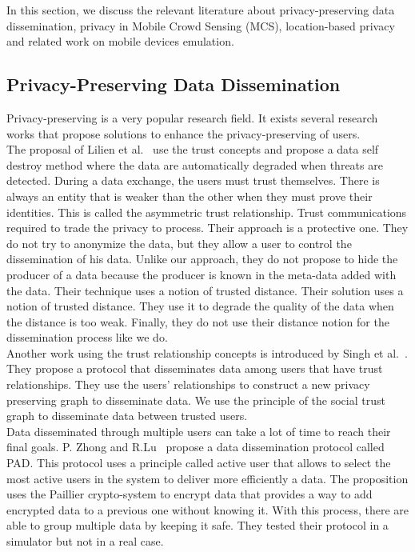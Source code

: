 

In this section, we discuss the relevant literature about privacy-preserving data dissemination, privacy in Mobile Crowd Sensing (MCS), location-based privacy and related work on mobile devices emulation.

\subsection{Privacy-Preserving Data Dissemination}

Privacy-preserving is a very popular research field.
It exists several research works that propose solutions to enhance the privacy-preserving of users.
\\

The proposal of Lilien et al.~\cite{DBLP:journals/tsmc/LilienB06} use the trust concepts and propose a data self destroy method where the data are automatically degraded when threats are detected.
During a data exchange, the users must trust themselves.
There is always an entity that is weaker than the other when they must prove their identities.
This is called the asymmetric trust relationship.
Trust communications required to trade the privacy to process.
Their approach is a protective one.
They do not try to anonymize the data, but they allow a user to control the dissemination of his data.
Unlike our approach, they do not propose to hide the producer of a data because the producer is known in the meta-data added with the data.
Their technique uses a notion of trusted distance.
Their solution uses a notion of trusted distance.
They use it to degrade the quality of the data when the distance is too weak.
Finally, they do not use their distance notion for the dissemination process like we do.
\\

Another work using the trust relationship concepts is introduced by Singh et al.~\cite{DBLP:conf/icdcs/SinghUSV12}.
They propose a protocol that disseminates data among users that have trust relationships.
They use the users' relationships to construct a new privacy preserving graph to disseminate data. 
We use the principle of the social trust graph to disseminate data between trusted users.
\\

Data disseminated through multiple users can take a lot of time to reach their final goals.
P. Zhong and R.Lu~\cite{DBLP:conf/iccoms/ZhongL14} propose a data dissemination protocol called PAD.
This protocol uses a principle called active user that allows to select the most active users in the system to deliver more efficiently a data.
The proposition uses the Paillier crypto-system to encrypt data that provides a way to add encrypted data to a previous one without knowing it. 
With this process, there are able to group multiple data by keeping it safe.
They tested their protocol in a simulator but not in a real case.
\\

